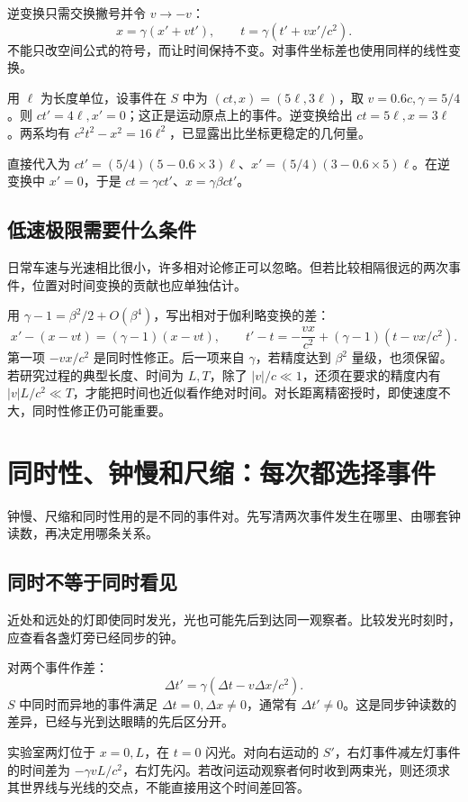 逆变换只需交换撇号并令 $v\to-v$：
\[
x=\gamma(x'+vt'),\qquad t=\gamma(t'+vx'/c^2).
\]
不能只改空间公式的符号，而让时间保持不变。对事件坐标差也使用同样的线性变换。

\begin{example}
用 $\ell$ 为长度单位，设事件在 $S$ 中为 $(ct,x)=(5\ell,3\ell)$，取 $v=0.6c,\gamma=5/4$。则 $ct'=4\ell,x'=0$；这正是运动原点上的事件。逆变换给出 $ct=5\ell,x=3\ell$。两系均有 $c^2t^2-x^2=16\ell^2$，已显露出比坐标更稳定的几何量。

直接代入为 $ct'=(5/4)(5-0.6\times3)\ell$、$x'=(5/4)(3-0.6\times5)\ell$。在逆变换中 $x'=0$，于是 $ct=\gamma ct'$、$x=\gamma\beta ct'$。
\end{example}

\subsection{低速极限需要什么条件}
日常车速与光速相比很小，许多相对论修正可以忽略。但若比较相隔很远的两次事件，位置对时间变换的贡献也应单独估计。

用 $\gamma-1=\beta^2/2+O(\beta^4)$，写出相对于伽利略变换的差：
\[
x'-(x-vt)=(\gamma-1)(x-vt),\qquad
t'-t=-\frac{vx}{c^2}+(\gamma-1)(t-vx/c^2).
\]
第一项 $-vx/c^2$ 是同时性修正。后一项来自 $\gamma$，若精度达到 $\beta^2$ 量级，也须保留。若研究过程的典型长度、时间为 $L,T$，除了 $|v|/c\ll1$，还须在要求的精度内有 $|v|L/c^2\ll T$，才能把时间也近似看作绝对时间。对长距离精密授时，即使速度不大，同时性修正仍可能重要。

\section{同时性、钟慢和尺缩：每次都选择事件}
钟慢、尺缩和同时性用的是不同的事件对。先写清两次事件发生在哪里、由哪套钟读数，再决定用哪条关系。

\subsection{同时不等于同时看见}
近处和远处的灯即使同时发光，光也可能先后到达同一观察者。比较发光时刻时，应查看各盏灯旁已经同步的钟。

对两个事件作差：
\[
\Delta t'=\gamma(\Delta t-v\Delta x/c^2).
\]
$S$ 中同时而异地的事件满足 $\Delta t=0,\Delta x\ne0$，通常有 $\Delta t'\ne0$。这是同步钟读数的差异，已经与光到达眼睛的先后区分开。
\begin{example}[两灯闪光]
实验室两灯位于 $x=0,L$，在 $t=0$ 闪光。对向右运动的 $S'$，右灯事件减左灯事件的时间差为 $-\gamma vL/c^2$，右灯先闪。若改问运动观察者何时收到两束光，则还须求其世界线与光线的交点，不能直接用这个时间差回答。
\end{example}

